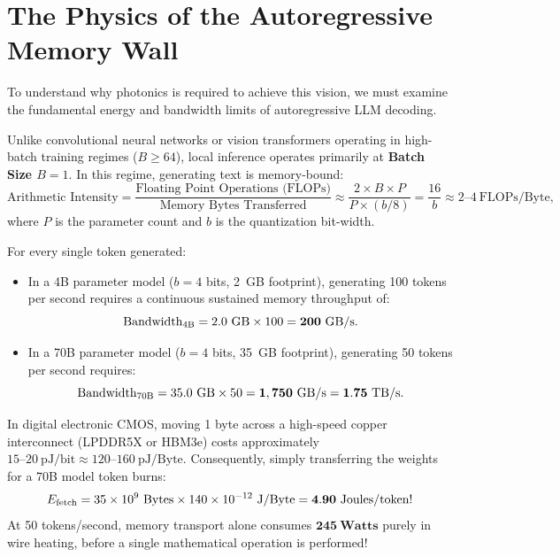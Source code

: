 \documentclass[11pt,a4paper]{report}
\begin{document}
\section{The Physics of the Autoregressive Memory Wall}
To understand why photonics is required to achieve this vision, we must examine the fundamental energy and bandwidth limits of autoregressive LLM decoding.

Unlike convolutional neural networks or vision transformers operating in high-batch training regimes ($B \ge 64$), local inference operates primarily at \textbf{Batch Size $B=1$}. In this regime, generating text is memory-bound:
\begin{equation}
\text{Arithmetic Intensity} = \frac{\text{Floating Point Operations (FLOPs)}}{\text{Memory Bytes Transferred}} \approx \frac{2 \times B \times P}{P \times (b / 8)} = \frac{16}{b} \approx 2\text{--}4~\text{FLOPs/Byte},
\end{equation}
where $P$ is the parameter count and $b$ is the quantization bit-width.

For every single token generated:
\begin{itemize}
\item In a 4B parameter model ($b=4$ bits, 2~GB footprint), generating 100 tokens per second requires a continuous sustained memory throughput of:
\begin{equation}
\text{Bandwidth}_{\rm 4B} = 2.0~\text{GB} \times 100 = \mathbf{200~\text{GB/s}}.
\end{equation}
\item In a 70B parameter model ($b=4$ bits, 35~GB footprint), generating 50 tokens per second requires:
\begin{equation}
\text{Bandwidth}_{\rm 70B} = 35.0~\text{GB} \times 50 = \mathbf{1,750~\text{GB/s}} = \mathbf{1.75~\text{TB/s}}.
\end{equation}
\end{itemize}

In digital electronic CMOS, moving 1 byte across a high-speed copper interconnect (LPDDR5X or HBM3e) costs approximately $15\text{--}20~\text{pJ/bit} \approx 120\text{--}160~\text{pJ/Byte}$. Consequently, simply transferring the weights for a 70B model token burns:
\begin{equation}
E_{\rm fetch} = 35 \times 10^9~\text{Bytes} \times 140 \times 10^{-12}~\text{J/Byte} = \mathbf{4.90~\text{Joules/token}}!
\end{equation}
At 50 tokens/second, memory transport alone consumes $\mathbf{245~\text{Watts}}$ purely in wire heating, before a single mathematical operation is performed!
\end{document}
